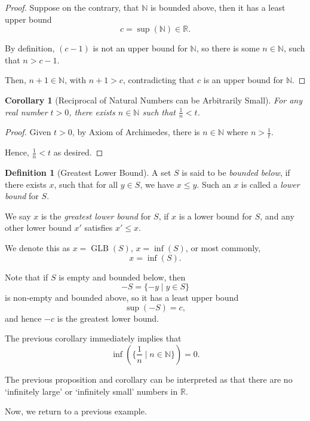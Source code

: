 \documentclass{article}
\newtheorem{corollary}[theorem]{Corollary}
\theoremstyle{definition}
\newtheorem{definition}[theorem]{Definition}
\theoremstyle{remark}
\newcommand{\pqty}[1]{\left(#1\right)}
\newcommand{\set}[2]{\{#1\mid #2\}}
\newcommand{\GLB}{\operatorname{GLB}}
\newcommand{\infimum}{\inf}
\newcommand{\NN}{\mathbb{N}}
\newcommand{\RR}{\mathbb{R}}
\begin{document}
\begin{proof}
    Suppose on the contrary, that \(\NN\) is bounded above, then it has a least upper bound
    \[
        c = \sup \pqty{\NN} \in \RR.
    \]

    By definition, \(\pqty{c - 1}\) is not an upper bound for \(\NN\), so there is some \(n \in \NN\), such that \(n > c - 1\).

    Then, \(n + 1 \in \NN\), with \(n + 1 > c\), contradicting that \(c\) is an upper bound for \(\NN\).
\end{proof}

\begin{corollary}[Reciprocal of Natural Numbers can be Arbitrarily Small]
    For any real number \(t > 0\), there exists \(n \in \NN\) such that \(\frac{1}{n} < t\).
\end{corollary}

\begin{proof}
    Given \(t > 0\), by Axiom of Archimedes, there is \(n \in \NN\) where \(n > \frac{1}{t}\).

    Hence, \(\frac{1}{n} < t\) as desired.
\end{proof}

\begin{definition}[Greatest Lower Bound]
    A set \(S\) is said to be \emph{bounded below}, if there exists \(x\), such that for all \(y \in S\), we have \(x \leq y\). Such an \(x\) is called a \emph{lower bound} for \(S\).

    We say \(x\) is the \emph{greatest lower bound} for \(S\), if \(x\) is a lower bound for \(S\), and any other lower bound \(x'\) satisfies \(x' \leq x\).

    We denote this as \(x = \GLB \pqty{S}\), \(x = \infimum\pqty{S}\), or most commonly,
    \[
        x = \inf \pqty{S}.
    \]
\end{definition}

Note that if \(S\) is empty and bounded below, then
\[
    -S = \set{-y}{y \in S}
\]
is non-empty and bounded above, so it has a least upper bound
\[
    \sup \pqty{-S} = c,
\]
and hence \(-c\) is the greatest lower bound.

The previous corollary immediately implies that
\[
    \inf \pqty{\set{\frac{1}{n}}{n \in \NN}} = 0.
\]

The previous proposition and corollary can be interpreted as that there are no `infinitely large' or `infinitely small' numbers in \(\RR\).

Now, we return to a previous example.
\end{document}
